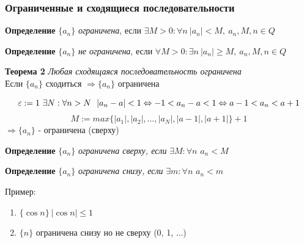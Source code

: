 \subsubsection{Ограниченные и сходящиеся последовательности}

\begin{tcolorbox}
\textbf{Определение}
$\{a_n\}$  \textit{ограничена}, если $\exists M>0: \forall n\ |a_n|<M,\ a_n, M, n \in Q$
\end{tcolorbox}

\begin{tcolorbox}
\textbf{Определение}
$\{a_n\}$  \textit{не ограничена}, если $\forall M>0: \exists n\ |a_n|\geq M,\ a_n, M, n \in Q$ 
\end{tcolorbox}

\begin{tcolorbox}
\textbf{Теорема 2} \textit{Любая сходящаяся последовательность ограничена} \\
Если $\{a_n\}$ сходиться $\Rightarrow \{a_n\}$ ограничена
\end{tcolorbox}

\begin{tcolorbox}[title=Доказательство Т2, breakable]
\[\eps := 1\ \exists N: \forall n > N\ \ |a_n-a| < 1 \Leftrightarrow -1<a_n-a<1 \Leftrightarrow a-1 < a_n < a+1  \]
\[ M:= max\{ |a_1|, |a_2|, ..., |a_N|, |a-1|, |a+1| \} + 1\]
$\Rightarrow \{a_n\}$ - ограничена (сверху)
\end{tcolorbox}

\begin{tcolorbox}
\textbf{Определение}
$\{a_n\}$  \textit{ограничена сверху, если} $\exists M: \forall n$ $a_n < M$
\end{tcolorbox}

\begin{tcolorbox}
\textbf{Определение}
$\{a_n\}$  \textit{ограничена снизу, если} $\exists m: \forall n$ $a_n < m$
\end{tcolorbox}

Пример:
\begin{enumerate}
    \item $\{\cos n\}\ |\cos n| \leq 1$
    \item $\{n\}$ ограничена снизу но не сверху (0, 1, ...)
\end{enumerate}


